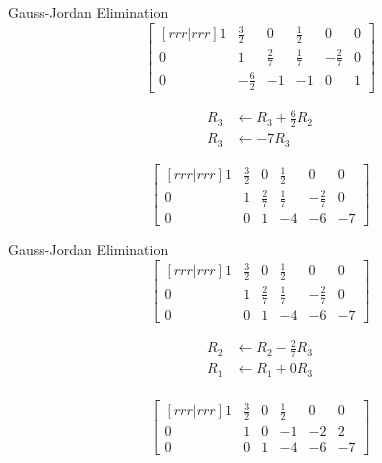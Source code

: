 \documentclass[serif,xcolor=pdftex,dvipsnames,table,hyperref={bookmarks=false,breaklinks}]{beamer}
\begin{document}
\begin{frame}[t]{Gauss-Jordan Elimination}
	$$\begin{bmatrix}[rrr|rrr]
    	1 & \frac{3}{2} & 0 & \frac{1}{2} & 0 & 0\\
		0 & 1 & \frac{2}{7} & \frac{1}{7} & -\frac{2}{7} & 0\\
		0 & -\frac{6}{2} & -1 & -1 & 0 & 1
	\end{bmatrix}$$
	
	\pause
	\begin{align*}
		R_3 &\leftarrow R_3 + \frac{6}{2}R_2\\
		R_3 &\leftarrow -7R_3
	\end{align*}
	
	\pause
	$$\begin{bmatrix}[rrr|rrr]
    	1 & \frac{3}{2} & 0 & \frac{1}{2} & 0 & 0\\
		0 & 1 & \frac{2}{7} & \frac{1}{7} & -\frac{2}{7} & 0\\
		0 & 0 & 1 & -4 & -6 & -7
	\end{bmatrix}$$
	
\end{frame}

\begin{frame}[t]{Gauss-Jordan Elimination}
	$$\begin{bmatrix}[rrr|rrr]
    	1 & \frac{3}{2} & 0 & \frac{1}{2} & 0 & 0\\
		0 & 1 & \frac{2}{7} & \frac{1}{7} & -\frac{2}{7} & 0\\
		0 & 0 & 1 & -4 & -6 & -7
	\end{bmatrix}$$
	
	\pause
	\begin{align*}
		R_2 &\leftarrow R_2 - \frac{2}{7}R_3\\
		R_1 &\leftarrow R_1 + 0R_3\\
	\end{align*}
	
	\pause
	$$\begin{bmatrix}[rrr|rrr]
    	1 & \frac{3}{2} & 0 & \frac{1}{2} & 0 & 0\\
		0 & 1 & 0 & -1 & -2 & 2\\
		0 & 0 & 1 & -4 & -6 & -7
	\end{bmatrix}$$
	
\end{frame}
\end{document}
